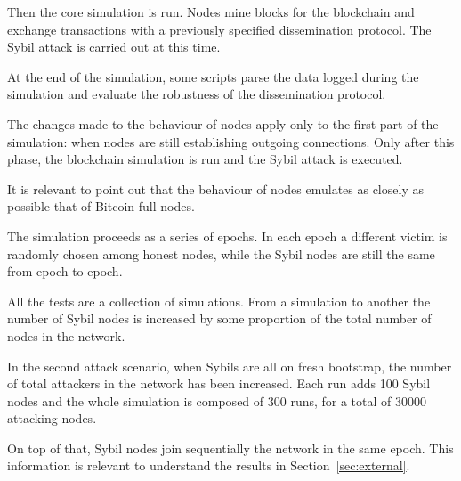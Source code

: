 Then the core simulation is run. Nodes mine blocks for the blockchain and exchange transactions with a previously specified dissemination protocol. The Sybil attack is carried out at this time.

At the end of the simulation, some scripts parse the data logged during the simulation and evaluate the robustness of the dissemination protocol.

The changes made to the behaviour of nodes apply only to the first part of the simulation: when nodes are still establishing outgoing connections. Only after this phase, the blockchain simulation is run and the Sybil attack is executed.

It is relevant to point out that the behaviour of nodes emulates as closely as possible that of Bitcoin full nodes.

The simulation proceeds as a series of epochs. In each epoch a different victim is randomly chosen among honest nodes, while the Sybil nodes are still the same from epoch to epoch.

All the tests are a collection of simulations. From a simulation to another the number of Sybil nodes is increased by some proportion of the total number of nodes in the network.

In the second attack scenario, when Sybils are all on fresh bootstrap, the number of total attackers in the network has been increased. Each run adds 100 Sybil nodes and the whole simulation is composed of 300 runs, for a total of 30000 attacking nodes.

On top of that, Sybil nodes join sequentially the network in the same epoch. This information is relevant to understand the results in Section~\ref{sec:external}.